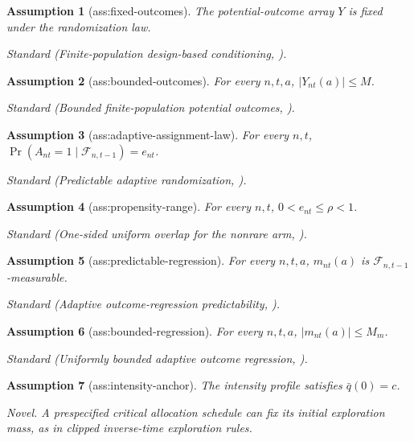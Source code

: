 \documentclass{article}
\newtheorem{assumption}{Assumption}
\begin{document}
\begin{assumption}[ass:fixed-outcomes]\label{ass:fixed-outcomes}
The potential-outcome array \(Y\) is fixed under the randomization law.
\par\smallskip\noindent\emph{Standard} (Finite-population design-based conditioning, \cite{LiZhao2026}).
\end{assumption}

\begin{assumption}[ass:bounded-outcomes]\label{ass:bounded-outcomes}
For every \(n,t,a\), \(|Y_{nt}(a)|\le M\).
\par\smallskip\noindent\emph{Standard} (Bounded finite-population potential outcomes, \cite{LiZhao2026}).
\end{assumption}

\begin{assumption}[ass:adaptive-assignment-law]\label{ass:adaptive-assignment-law}
For every \(n,t\), \(\Pr(A_{nt}=1\mid\mathcal F_{n,t-1})=e_{nt}\).
\par\smallskip\noindent\emph{Standard} (Predictable adaptive randomization, \cite{LiZhao2026}).
\end{assumption}

\begin{assumption}[ass:propensity-range]\label{ass:propensity-range}
For every \(n,t\), \(0<e_{nt}\le\rho<1\).
\par\smallskip\noindent\emph{Standard} (One-sided uniform overlap for the nonrare arm, \cite{HongLeungLi2020}).
\end{assumption}

\begin{assumption}[ass:predictable-regression]\label{ass:predictable-regression}
For every \(n,t,a\), \(m_{nt}(a)\) is \(\mathcal F_{n,t-1}\)-measurable.
\par\smallskip\noindent\emph{Standard} (Adaptive outcome-regression predictability, \cite{LiZhao2026}).
\end{assumption}

\begin{assumption}[ass:bounded-regression]\label{ass:bounded-regression}
For every \(n,t,a\), \(|m_{nt}(a)|\le M_m\).
\par\smallskip\noindent\emph{Standard} (Uniformly bounded adaptive outcome regression, \cite{LiZhao2026}).
\end{assumption}

\begin{assumption}[ass:intensity-anchor]\label{ass:intensity-anchor}
The intensity profile satisfies \(\bar q(0)=c\).
\par\smallskip\noindent\emph{Novel.} A prespecified critical allocation schedule can fix its initial exploration mass, as in clipped inverse-time exploration rules.
\end{assumption}
\end{document}
